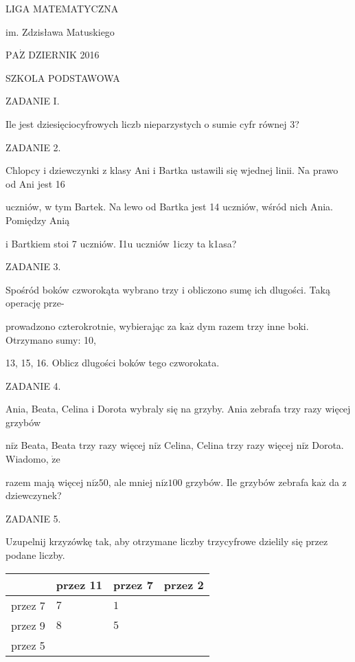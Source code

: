 \documentclass[a4paper,12pt]{article}
\begin{document}
LIGA MATEMATYCZNA

im. Zdzisława Matuskiego

$\mathrm{P}\mathrm{A}\dot{\mathrm{Z}}$ DZIERNIK 2016

SZKOLA PODSTAWOWA

ZADANIE I.

Ile jest dziesięciocyfrowych liczb nieparzystych o sumie cyfr równej 3?

ZADANIE 2.

Chlopcy i dziewczynki z klasy Ani i Bartka ustawili się wjednej linii. Na prawo od Ani jest 16

uczniów, w tym Bartek. Na lewo od Bartka jest 14 uczniów, wśród nich Ania. Pomiędzy Anią

i Bartkiem stoi 7 uczniów. I1u uczniów 1iczy ta k1asa?

ZADANIE 3.

Spośród boków czworokąta wybrano trzy i obliczono sumę ich dlugości. Taką operację prze-

prowadzono czterokrotnie, wybierając za $\mathrm{k}\mathrm{a}\dot{\mathrm{z}}$ dym razem trzy inne boki. Otrzymano sumy: 10,

13, 15, 16. Oblicz dlugości boków tego czworokata.

ZADANIE 4.

Ania, Beata, Celina i Dorota wybraly się na grzyby. Ania zebrafa trzy razy więcej grzybów

$\mathrm{n}\mathrm{i}\dot{\mathrm{z}}$ Beata, Beata trzy razy więcej $\mathrm{n}\mathrm{i}\dot{\mathrm{z}}$ Celina, Celina trzy razy więcej $\mathrm{n}\mathrm{i}\dot{\mathrm{z}}$ Dorota. Wiadomo, $\dot{\mathrm{z}}\mathrm{e}$

razem mają więcej $\mathrm{n}\mathrm{i}\dot{\mathrm{z}}50$, ale mniej $\mathrm{n}\mathrm{i}\dot{\mathrm{z}}100$ grzybów. Ile grzybów zebrafa $\mathrm{k}\mathrm{a}\dot{\mathrm{z}}$ da z dziewczynek?

ZADANIE 5.

Uzupelnij krzyzówkę tak, aby otrzymane liczby trzycyfrowe dzielily się przez podane liczby.
\begin{center}
\begin{tabular}{|l|l|l|l|}
\hline
\multicolumn{1}{|l|}{}&	\multicolumn{1}{|l|}{przez 11}&	\multicolumn{1}{|l|}{przez 7}&	\multicolumn{1}{|l|}{przez 2}	\\
\hline
\multicolumn{1}{|l|}{przez 7}&	\multicolumn{1}{|l|}{$7$}&	\multicolumn{1}{|l|}{ $1$}&	\multicolumn{1}{|l|}{}	\\
\hline
\multicolumn{1}{|l|}{przez 9}&	\multicolumn{1}{|l|}{$8$}&	\multicolumn{1}{|l|}{ $5$}&	\multicolumn{1}{|l|}{}	\\
\hline
\multicolumn{1}{|l|}{przez 5}&	\multicolumn{1}{|l|}{}&	\multicolumn{1}{|l|}{}&	\multicolumn{1}{|l|}{}	\\
\hline
\end{tabular}

\end{center}
\end{document}
